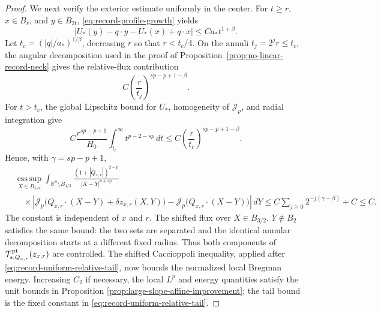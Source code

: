 \documentclass[11pt,reqno]{amsart}
\numberwithin{equation}{section}
\newcommand{\R}{\mathbb R}
\newcommand{\Jp}{\mathcal J_p}
\newcommand{\dd}{\,d}
\theoremstyle{remark}
\begin{document}
\begin{proof}
We next verify the exterior estimate uniformly in the center.  For
\(t\ge r\), \(x\in B_r\), and \(y\in B_{2t}\),
\eqref{eq:record-profile-growth} yields
\[
 |U_*(y)-q\cdot y-U_*(x)+q\cdot x|
 \le C a_*t^{1+\beta}.
\]
Let \(t_c=(|q|/a_*)^{1/\beta}\), decreasing \(r\) so that
\(r<t_c/4\).  On the annuli \(t_j=2^jr\le t_c\), the angular decomposition used in
the proof of Proposition~\ref{prop:no-linear-record-neck} gives the
relative-flux contribution
\begin{equation*}
 C\left(\frac r{t_j}\right)^{sp-p+1-\beta}.
\end{equation*}
For \(t>t_c\), the global Lipschitz bound for \(U_*\), homogeneity of
\(\Jp\), and radial integration give
\begin{equation*}
 C\frac{r^{sp-p+1}}{H_0}
 \int_{t_c}^\infty t^{p-2-sp}\dd t
 \le C\left(\frac r{t_c}\right)^{sp-p+1-\beta}.
\end{equation*}
Hence, with \(\gamma=sp-p+1\),
\begin{equation}
 \begin{split}
 &{\operatorname*{ess\,sup}}_{X\in B_{5/4}}
 \int_{\R^n\setminus B_{4/3}}
 \frac{(1+|Q_{x,r}|)^{2-p}}
 {|X-Y|^{n+sp}}\\
 &\quad\times
 \left|\Jp\bigl(Q_{x,r}\cdot(X-Y)
                   +\delta z_{x,r}(X,Y)\bigr)
       -\Jp\bigl(Q_{x,r}\cdot(X-Y)\bigr)\right|\dd Y
 \le C\sum_{j\ge0}2^{-j(\gamma-\beta)}+C\le C.
 \end{split}
 \label{eq:record-uniform-relative-tail}
\end{equation}
The constant is independent of \(x\) and \(r\).  The shifted
flux over \(X\in B_{3/2}\), \(Y\notin B_2\) satisfies the same bound:
the two sets are separated and the identical annular decomposition
starts at a different fixed radius.  Thus both components of
\(\mathcal T^{\rm pt}_{s,Q_{x,r}}(z_{x,r})\) are controlled.
The shifted
Caccioppoli inequality, applied after
\eqref{eq:record-uniform-relative-tail}, now bounds the normalized local
Bregman energy.  Increasing \(C_2\) if necessary, the local
\(L^p\) and energy quantities satisfy the unit bounds in Proposition
\ref{prop:large-slope-affine-improvement}; the tail bound is the fixed
constant in \eqref{eq:record-uniform-relative-tail}.


\end{proof}
\end{document}
